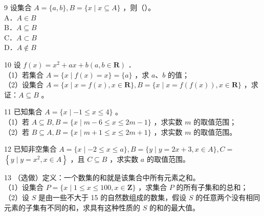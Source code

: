\documentclass[10pt]{article}
\begin{document}
9 设集合 \(A=\{a, b\}, B=\{x \mid x \subseteq A\}\) ，则（）。\\
A．\(A \in B\)\\
B．\(A \subseteq B\)\\
C．\(A \subset B\)\\
D．\(A \notin B\)

10 设 \(f(x)=x^{2}+a x+b(a, b \in \mathbf{R})\) ．\\
（1）若集合 \(A=\{x \mid f(x)=x\}=\{a\}\) ，求 \(a 、 b\) 的值；\\
（2）设集合 \(A=\{x \mid x=f(x), x \in \mathbf{R}\}, B=\{x \mid x=f(f(x)), x \in \mathbf{R}\}\) ，求证：\(A \subseteq B\) 。

11 已知集合 \(A=\{x \mid-1 \leqslant x \leqslant 4\}\) 。\\
（1）若 \(A \subseteq B, B=\{x \mid m-6 \leqslant x \leqslant 2 m-1\}\) ，求实数 \(m\) 的取值范围；\\
（2）若 \(B \subseteq A, B=\{x \mid m+1 \leqslant x \leqslant 2 m+1\}\) ，求实数 \(m\) 的取值范围。

12 已知非空集合 \(A=\{x \mid-2 \leqslant x \leqslant a\}, B=\{y \mid y=2 x+3, x \in A\}, C=\) \(\left\{y \mid y=x^{2}, x \in A\right\}\) ，且 \(C \subseteq B\) ，求实数 \(a\) 的取值范围。

13 （选做）定义：一个数集的和就是该集合中所有元素之和。\\
（1）设集合 \(P=\{x \mid 1 \leqslant x \leqslant 100, x \in \mathbf{Z}\}\) ，求集合 \(P\) 的所有子集和的总和；\\
（2）设 \(S\) 是由一些不大于 15 的自然数组成的数集，假设 \(S\) 的任意两个没有相同元素的子集有不同的和，求具有这种性质的 \(S\) 的和的最大值。
\end{document}
